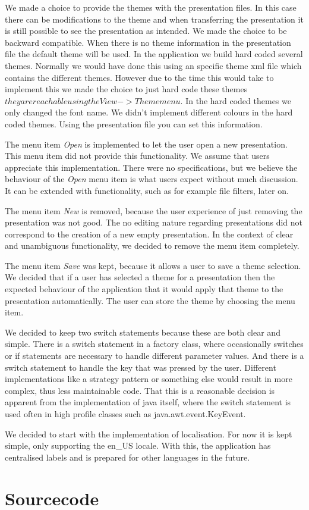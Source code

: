 \documentclass[a4paper]{article}
\begin{document}
We made a choice to provide the themes with the presentation files. In this case there can be modifications to the theme and when transferring the presentation it is still possible to see the presentation as intended. We made the choice to be backward compatible. When there is no theme information in the presentation file the default theme will be used. In the application we build hard coded several themes. Normally we would have done this using an specific theme xml file which contains the different themes. However due to the time this would take to implement this we made the choice to just hard code these themes \(they are reachable using the View->Theme menu. \) In the hard coded themes we only changed the font name. We didn't implement different colours in the hard coded themes. Using the presentation file you can set this information.

The menu item \textit{Open} is implemented to let the user open a new presentation. This menu item did not provide this functionality. We assume that users appreciate this implementation. There were no specifications, but we believe the behaviour of the \textit{Open} menu item is what users expect without much discussion. It can be extended with functionality, such as for example file filters, later on.

The menu item \textit{New} is removed, because the user experience of just removing the presentation was not good. The no editing nature regarding presentations did not correspond to the creation of a new empty presentation. In the context of clear and unambiguous functionality, we decided to remove the menu item completely.

The menu item \textit{Save} was kept, because it allows a user to save a theme selection. We decided that if a user has selected a theme for a presentation then the expected behaviour of the application that it would apply that theme to the presentation automatically. The user can store the theme by choosing the menu item.

We decided to keep two switch statements because these are both clear and simple. There is a switch statement in a factory class, where occasionally switches or if statements are necessary to handle different parameter values. And there is a switch statement to handle the key that was pressed by the user. Different implementations like a strategy pattern or something else would result in more complex, thus less maintainable code. That this is a reasonable decision is apparent from the implementation of java itself, where the switch statement is used often in high profile classes such as java.awt.event.KeyEvent.

We decided to start with the implementation of localisation. For now it is kept simple, only supporting the en\_US locale. With this, the application has centralised labels and is prepared for other languages in the future.   

\section{Sourcecode}
\end{document}
